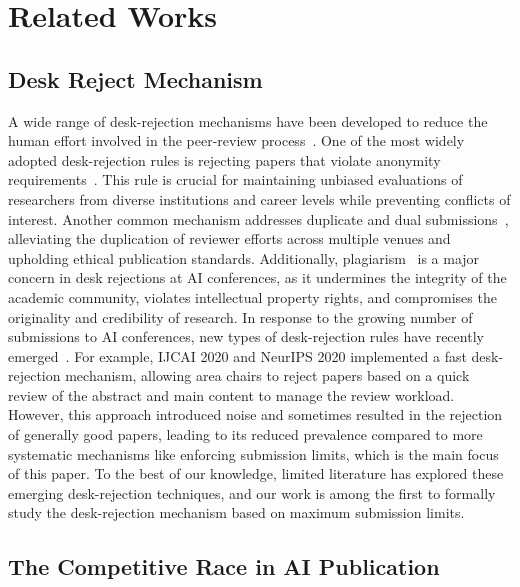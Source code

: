 \section{Related Works} \label{sec:related_works}

\subsection{Desk Reject Mechanism}


A wide range of desk-rejection mechanisms have been developed to reduce the human effort involved in the peer-review process~\cite{as21}. One of the most widely adopted desk-rejection rules is rejecting papers that violate anonymity requirements~\cite{jawd02, t18}. This rule is crucial for maintaining unbiased evaluations of researchers from diverse institutions and career levels while preventing conflicts of interest. Another common mechanism addresses duplicate and dual submissions~\cite{s03, l13}, alleviating the duplication of reviewer efforts across multiple venues and upholding ethical publication standards. Additionally, plagiarism~\cite{kc23, er23} is a major concern in desk rejections at AI conferences, as it undermines the integrity of the academic community, violates intellectual property rights, and compromises the originality and credibility of research. In response to the growing number of submissions to AI conferences, new types of desk-rejection rules have recently emerged~\cite{lnz+24}. For example, IJCAI 2020 and NeurIPS 2020 implemented a fast desk-rejection mechanism, allowing area chairs to reject papers based on a quick review of the abstract and main content to manage the review workload. However, this approach introduced noise and sometimes resulted in the rejection of generally good papers, leading to its reduced prevalence compared to more systematic mechanisms like enforcing submission limits, which is the main focus of this paper. To the best of our knowledge, limited literature has explored these emerging desk-rejection techniques, and our work is among the first to formally study the desk-rejection mechanism based on maximum submission limits.

\subsection{The Competitive Race in AI Publication}


